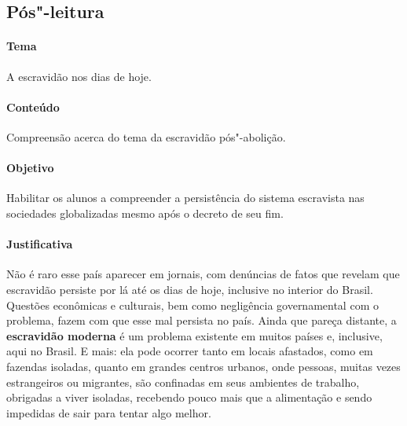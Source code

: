 \documentclass[11pt]{extarticle}
\begin{document}


\subsection{Pós"-leitura}

 \paragraph{Tema} A escravidão nos dias de hoje.

 \paragraph{Conteúdo} Compreensão acerca do tema da escravidão pós"-abolição.

 \paragraph{Objetivo} Habilitar os alunos a compreender a persistência 
 do sistema escravista nas sociedades globalizadas mesmo após o decreto
 de seu fim.

 \paragraph{Justificativa} Não é raro esse país aparecer
em jornais, com denúncias de fatos que revelam que escravidão persiste
por lá até os dias de hoje, inclusive no interior do Brasil. 
Questões econômicas e culturais, bem como
negligência governamental com o problema, fazem com que esse mal
persista no país. Ainda que pareça distante, a \textbf{escravidão
moderna} é um problema existente em muitos países e, inclusive, aqui no
Brasil. E mais: ela pode ocorrer tanto em locais afastados, como em
fazendas isoladas, quanto em grandes centros urbanos, onde pessoas,
muitas vezes estrangeiros ou migrantes, são confinadas em seus ambientes
de trabalho, obrigadas a viver isoladas, recebendo pouco mais que a
alimentação e sendo impedidas de sair para tentar algo melhor.
\end{document}
